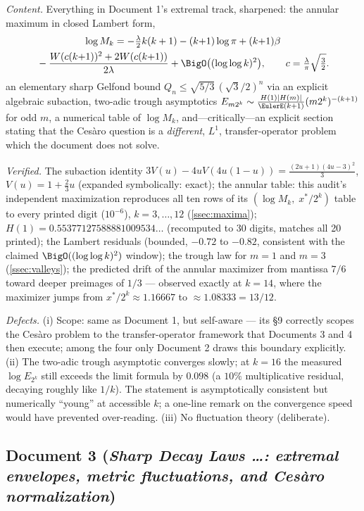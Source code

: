 \documentclass[11pt,oneside]{article}
\theoremstyle{definition}
\theoremstyle{remark}
\begin{document}
\emph{Content.}  Everything in Document 1's extremal track, sharpened: the
annular maximum in closed Lambert form,
\begin{multline*}
 \log M_k=-\tfrac{\lambda}{2}k(k+1)-(k{+}1)\log\pi+(k{+}1)\beta\\
 {}-\frac{W(c(k{+}1))^2+2W(c(k{+}1))}{2\lambda}
 +\BigO\bigl((\log\log k)^2\bigr),
 \qquad c=\tfrac{\lambda}{\pi}\sqrt{\tfrac32}.
\end{multline*}
an elementary sharp Gelfond bound
$Q_n\le\sqrt{5/3}\,(\sqrt3/2)^n$ via an explicit algebraic subaction,
two-adic trough asymptotics
$E_{m2^k}\sim\frac{H(1)|H(m)|}{\EulerE(k+1)}(m2^k)^{-(k+1)}$ for odd $m$, a
numerical table of $\log M_k$, and---critically---an explicit section
stating that the Ces\`aro question is a \emph{different}, $L^1$,
transfer-operator problem which the document does not solve.

\emph{Verified.}  The subaction identity
$3V(u)-4uV(4u(1-u))=\tfrac{(2u+1)(4u-3)^2}{3}$, $V(u)=1+\tfrac23u$
(expanded symbolically: exact); the annular table: this audit's independent
maximization reproduces all ten rows of its $(\log M_k,\;x^*/2^k)$ table to
every printed digit ($10^{-6}$), $k=3,\dots,12$ (\cref{ssec:maxima});
$H(1)=0.55377127588881009534\ldots$ (recomputed to 30 digits, matches all
20 printed); the Lambert residuals (bounded, $-0.72$ to $-0.82$, consistent
with the claimed $\BigO((\log\log k)^2)$ window); the trough law for
$m=1$ and $m=3$ (\cref{ssec:valleys}); the predicted drift of the annular
maximizer from mantissa $7/6$ toward deeper preimages of $1/3$ --- observed
exactly at $k=14$, where the maximizer jumps from
$x^*/2^k\approx1.16667$ to $\approx1.08333=13/12$.

\emph{Defects.}
(i) Scope: same as Document 1, but self-aware --- its \S9 correctly
scopes the Ces\`aro problem to the transfer-operator framework that
Documents 3 and 4 then execute; among the four only Document 2 draws this
boundary explicitly.
(ii) The two-adic trough asymptotic converges slowly; at $k=16$ the
measured $\log E_{2^k}$ still exceeds the limit formula by $0.098$
(a $10\%$ multiplicative residual, decaying roughly like $1/k$).  The
statement is asymptotically consistent but numerically ``young'' at
accessible $k$; a one-line remark on the convergence speed would have
prevented over-reading.
(iii) No fluctuation theory (deliberate).

\subsection{Document 3 (\emph{Sharp Decay Laws \dots: extremal envelopes,
metric fluctuations, and Ces\`aro normalization})}
\end{document}
